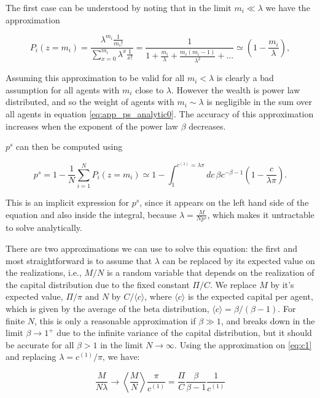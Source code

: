 The first case can be understood by noting that in the limit $m_i \ll \lambda$ we have the approximation

\begin{equation}
P_i(z=m_i) = \frac{\lambda^{m_i} \frac{1}{m_i!}}{\sum_{x=0}^{m_i} \lambda^x \frac{1}{x!}} = \frac{1}{1 + \frac{m_i}{\lambda} + \frac{m_i (m_i -1)}{\lambda^2} + \ldots} \simeq  \left( 1 - \frac{m_i}{\lambda} \right),
\end{equation}

Assuming this approximation to be valid for all $m_i < \lambda$ is clearly a bad assumption for all agents with $m_i$ close to $\lambda$. 
However the wealth is power law distributed, and so the weight of agents with $m_i \sim \lambda$ is negligible in the sum over all agents in equation \eqref{eq:app_ps_analytic0}. The accuracy of this approximation increases when the exponent of the power law $\beta$ decreases. 

$p^s$ can then be computed using

\begin{equation}
\label{eq:app_ps_analytic1}
p^s = 1 - \frac{1}{N} \sum_{i=1}^{N} P_i(z = m_i) \simeq 1 - \int_1^{c^{(1)} = \lambda \pi} dc\, \beta c^{-\beta - 1} \left( 1 - \frac{c}{\lambda \pi} \right) .
\end{equation}

This is an implicit expression for $p^s$, since it appears on the left hand side of the equation and also inside the integral, because $\lambda = \frac{M}{N p^s}$, which makes it untractable to solve analytically. 

There are two approximations we can use to solve this equation: the first and most straightforward is to assume that $\lambda$ can be replaced by its expected value on the realizations, i.e., $M/N$ is a random variable that depends on the realization of the capital distribution due to the fixed constant $\Pi/C$.  We replace $M$ by it's expected value, $\Pi/\pi$ and $N$ by $C / \langle c \rangle$, where $\langle c \rangle$ is the expected capital per agent, which is given by the average of the beta distribution, $\langle c \rangle = \beta/(\beta-1)$. For finite $N$, this is only a reasonable approximation if $\beta \gg 1$, and breaks down in the limit $\beta \to 1^+$ due to the infinite variance of the capital distribution, but it should be accurate for all $\beta > 1$ in the limit $N \to \infty$. Using the approximation on \eqref{eq:c1} and replacing $\lambda = c^{(1)} / \pi$, we have:

\begin{equation}
\frac{M}{N \lambda} \to \left \langle \frac{M}{N} \right \rangle \frac{\pi}{c^{(1)}} = \frac{\Pi}{C} \frac{\beta}{\beta - 1} \frac{1}{c^{(1)}}
\end{equation}

